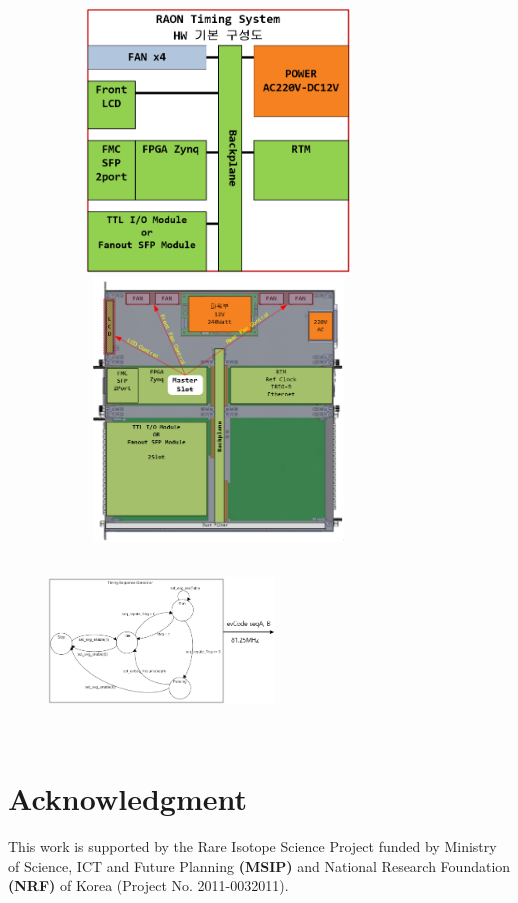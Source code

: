 \documentclass[journal]{IEEEtran}
\begin{document}
\begin{figure}[!htb]
	\centering
	\includegraphics*[width=90mm, height=70mm]{img03.png}
	\includegraphics*[width=90mm, height=70mm]{img04.png}
	\includegraphics*[width=60mm, height=50mm]{img17.png}
\end{figure}

\section*{Acknowledgment}
This work is supported by the Rare Isotope Science Project funded by Ministry of Science, ICT and Future Planning \textbf{(MSIP)} and National Research Foundation \textbf{(NRF)} of Korea (Project No. 2011-0032011).
\end{document}
